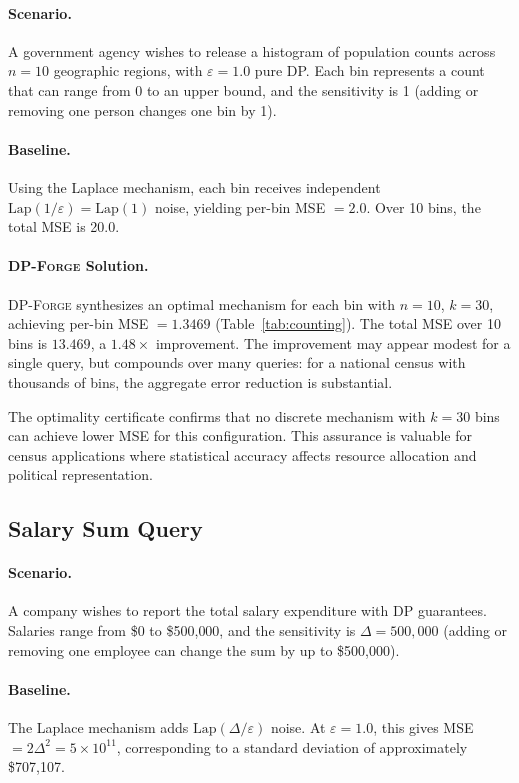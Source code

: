 \documentclass[11pt,a4paper]{article}
\newcommand{\dpforge}{\textsc{DP-Forge}}
\newcommand{\eps}{\varepsilon}
\begin{document}
\paragraph{Scenario.}
A government agency wishes to release a histogram of population counts across
$n = 10$ geographic regions, with $\eps = 1.0$ pure DP.  Each bin represents
a count that can range from 0 to an upper bound, and the sensitivity is 1
(adding or removing one person changes one bin by 1).

\paragraph{Baseline.}
Using the Laplace mechanism, each bin receives independent
$\text{Lap}(1/\eps) = \text{Lap}(1)$ noise, yielding per-bin MSE $= 2.0$.
Over 10 bins, the total MSE is 20.0.

\paragraph{\dpforge{} Solution.}
\dpforge{} synthesizes an optimal mechanism for each bin with $n = 10$, $k = 30$,
achieving per-bin MSE $= 1.3469$ (Table~\ref{tab:counting}).  The total MSE over
10 bins is $13.469$, a $1.48\times$ improvement.  The improvement may appear
modest for a single query, but compounds over many queries: for a national census
with thousands of bins, the aggregate error reduction is substantial.

The optimality certificate confirms that no discrete mechanism with $k = 30$ bins
can achieve lower MSE for this configuration.  This assurance is valuable for
census applications where statistical accuracy affects resource allocation and
political representation.

\subsection{Salary Sum Query}

\paragraph{Scenario.}
A company wishes to report the total salary expenditure with DP guarantees.
Salaries range from \$0 to \$500{,}000, and the sensitivity is $\Delta = 500{,}000$
(adding or removing one employee can change the sum by up to \$500{,}000).

\paragraph{Baseline.}
The Laplace mechanism adds $\text{Lap}(\Delta/\eps)$ noise.  At $\eps = 1.0$,
this gives MSE $= 2\Delta^2 = 5 \times 10^{11}$, corresponding to a standard
deviation of approximately \$707{,}107.
\end{document}
